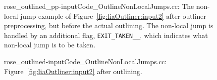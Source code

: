 \begin{figure}[!h]
{\indent
{\mySmallFontSize
\begin{latexonly}
   
\end{latexonly}
\begin{htmlonly}
   
\end{htmlonly}

}
}
\caption{rose\_outlined\_pp-inputCode\_OutlineNonLocalJumps.cc: The
non-local jump example of Figure~\ref{fig:liaOutliner:input2} after
outliner preprocessing, but before the actual outlining.  The
non-local jump is handled by an additional flag,
\texttt{EXIT\_TAKEN\_\_}, which indicates what non-local jump is to be
taken.}
\label{fig:liaOutliner:preproc2}
\end{figure}

\begin{figure}[!h]
{\indent
{\mySmallFontSize
\begin{latexonly}
   
\end{latexonly}
\begin{htmlonly}
   
\end{htmlonly}

}
}
\caption{rose\_outlined-inputCode\_OutlineNonLocalJumps.cc:
Figure~\ref{fig:liaOutliner:input2} after outlining.}
\label{fig:liaOutliner:output2}
\end{figure}

